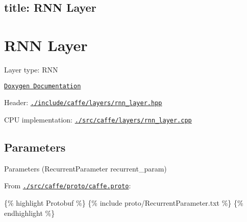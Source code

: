 

 \subsection*{title\+: R\+NN Layer }

\section*{R\+NN Layer}


\begin{DoxyItemize}
\item Layer type\+: {\ttfamily R\+NN}
\item \href{http://caffe.berkeleyvision.org/doxygen/classcaffe_1_1RNNLayer.html}{\tt Doxygen Documentation}
\item Header\+: \href{https://github.com/BVLC/caffe/blob/master/include/caffe/layers/rnn_layer.hpp}{\tt {\ttfamily ./include/caffe/layers/rnn\+\_\+layer.hpp}}
\item C\+PU implementation\+: \href{https://github.com/BVLC/caffe/blob/master/src/caffe/layers/rnn_layer.cpp}{\tt {\ttfamily ./src/caffe/layers/rnn\+\_\+layer.cpp}}
\end{DoxyItemize}

\subsection*{Parameters}


\begin{DoxyItemize}
\item Parameters ({\ttfamily Recurrent\+Parameter recurrent\+\_\+param})
\item From \href{https://github.com/BVLC/caffe/blob/master/src/caffe/proto/caffe.proto}{\tt {\ttfamily ./src/caffe/proto/caffe.proto}}\+:
\end{DoxyItemize}

\{\% highlight Protobuf \%\} \{\% include proto/\+Recurrent\+Parameter.\+txt \%\} \{\% endhighlight \%\} 